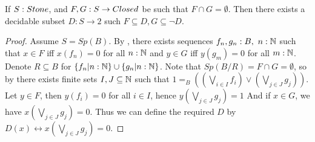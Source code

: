 \begin{lemma}\label{StoneSeperated}
  If $S:\Stone $, and $F,G:S \to \Closed$ be such that $F\cap G = \emptyset$. 
  Then there exists a decidable subset $D:S \to 2$ such $F\subseteq D, G \subseteq \neg D$. 
\end{lemma}
\begin{proof}
  Assume $S = Sp(B)$. 
  By , there exists sequences $f_n,g_n:B,~n:\mathbb{N}$ such that 
  $x\in F$ iff $x(f_n) = 0$ for all $n:\mathbb{N}$ and 
  $y\in G$ iff $y(g_m) = 0$ for all $m:\mathbb{N}$. 
%
  Denote $R\subseteq B$ for $\{f_n|n:\mathbb{N}\} \cup\{g_n|n:\mathbb{N}\}$. 
  Note that $Sp(B/R) = F \cap G=\emptyset$, so by 
%
  there exists finite sets $I,J\subseteq \mathbb{N} $ such that 
  $1 =_B ((\bigvee_{i\in I}  f_i) \vee (\bigvee_{j\in J}  g_j)).$
%
  Let $y\in F$, then $y(f_i) = 0$ for all $i\in I$, hence
  $y(\bigvee_{j\in J} g_j) = 1 $
  And if $x\in G$, we have 
  $x(\bigvee_{j\in J} g_j) = 0$. 
  Thus we can define the required $D$ by 
  $D(x) \leftrightarrow x(\bigvee_{j\in J} g_j) = 0$.
  
\end{proof} 


